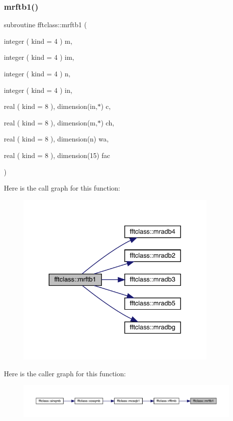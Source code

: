 \subsubsection{\texorpdfstring{mrftb1()}{mrftb1()}}
{\footnotesize\ttfamily subroutine fftclass\+::mrftb1 (\begin{DoxyParamCaption}\item[{integer ( kind = 4 )}]{m,  }\item[{integer ( kind = 4 )}]{im,  }\item[{integer ( kind = 4 )}]{n,  }\item[{integer ( kind = 4 )}]{in,  }\item[{real ( kind = 8 ), dimension(in,$\ast$)}]{c,  }\item[{real ( kind = 8 ), dimension(m,$\ast$)}]{ch,  }\item[{real ( kind = 8 ), dimension(n)}]{wa,  }\item[{real ( kind = 8 ), dimension(15)}]{fac }\end{DoxyParamCaption})}

Here is the call graph for this function\+:\nopagebreak
\begin{figure}[H]
\begin{center}
\leavevmode
\includegraphics[width=283pt]{namespacefftclass_a025f68a6ddd573ad3fa337835b621d3c_cgraph}
\end{center}
\end{figure}
Here is the caller graph for this function\+:\nopagebreak
\begin{figure}[H]
\begin{center}
\leavevmode
\includegraphics[width=350pt]{namespacefftclass_a025f68a6ddd573ad3fa337835b621d3c_icgraph}
\end{center}
\end{figure}
\mbox{\label{namespacefftclass_a5b17cd46c9d021ed6dfe9499fc802b3f}} 

